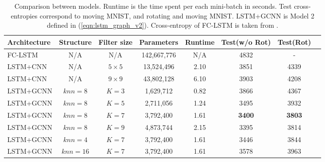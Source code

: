 \documentclass{article} %
\newcommand{\eqnref}[1]{(\ref{eqn:#1})}
\begin{document}
\begin{table}
	\centering
	{\small
	\begin{tabular}{lccccccc}
		\toprule
		Architecture & Structure & Filter size & Parameters & Runtime & Test(w/o Rot) & Test(Rot) \\%
		\midrule
		FC-LSTM & N/A & N/A & 142,667,776 & N/A & 4832 & - \\%
		LSTM+CNN & N/A & $5 \times 5$ & 13,524,496 & 2.10 & 3851 & 4339 \\%
		LSTM+CNN & N/A & $9 \times 9$ & 43,802,128 & 6.10 & 3903 & 4208 \\%

		LSTM+GCNN & $knn=8$ & $K=3$ & 1,629,712 & 0.82 & 3866 & 4367 \\%
		LSTM+GCNN & $knn=8$ & $K=5$ & 2,711,056 & 1.24 & 3495 & 3932 \\%
		LSTM+GCNN & $knn=8$ & $K=7$ & 3,792,400 & 1.61 & {\bf 3400} & {\bf 3803} \\%
		LSTM+GCNN & $knn=8$ & $K=9$ & 4,873,744 & 2.15 & 3395 & 3814 \\%
		
		LSTM+GCNN & $knn=4$ & $K=7$ & 3,792,400 & 1.61 & 3446 & 3844 \\%
		LSTM+GCNN & $knn=16$ & $K=7$ & 3,792,400 & 1.61 & 3578 & 3963 \\%
		\bottomrule
	\end{tabular}
	}
	\caption{Comparison between models. Runtime is the time spent per each mini-batch in seconds. Test cross-entropies correspond to moving MNIST, and rotating and moving MNIST. LSTM+GCNN is Model 2 defined in \eqnref{lstm_graph_v2}. Cross-entropy of FC-LSTM is taken from \cite{convlstm}.}
	\label{tab:moving_mnist}
\end{table}
\end{document}
